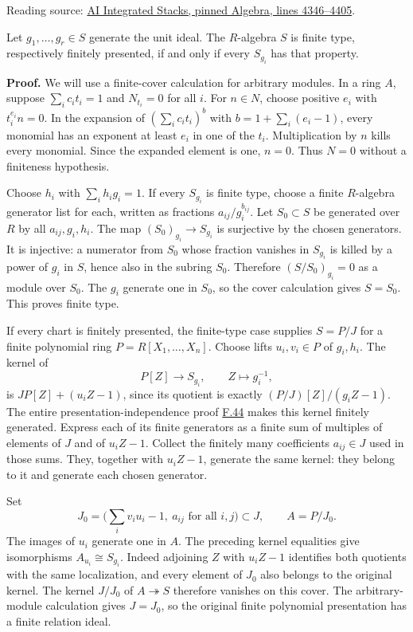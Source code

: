 \documentclass[11pt,a4paper,openany]{report}
\begin{document}
Reading source: \href{https://github.com/KokunoYumeto/unofficial-stacks-project-ai-drafts/blob/565b10e987aba5969b21145a0833f42d69f96790/algebra.tex\#L4346-L4405}{AI Integrated Stacks, pinned Algebra, lines 4346--4405}.

Let \(g_1,\ldots,g_r\in S\) generate the unit ideal. The \(R\)-algebra \(S\) is finite type, respectively finitely presented, if and only if every \(S_{g_i}\) has that property.

\textbf{Proof.} We will use a finite-cover calculation for arbitrary modules. In a ring \(A\), suppose \(\sum_i c_it_i=1\) and \(N_{t_i}=0\) for all \(i\). For \(n\in N\), choose positive \(e_i\) with \(t_i^{e_i}n=0\). In the expansion of \((\sum_i c_it_i)^b\) with \(b=1+\sum_i(e_i-1)\), every monomial has an exponent at least \(e_i\) in one of the \(t_i\). Multiplication by \(n\) kills every monomial. Since the expanded element is one, \(n=0\). Thus \(N=0\) without a finiteness hypothesis.

Choose \(h_i\) with \(\sum_i h_ig_i=1\). If every \(S_{g_i}\) is finite type, choose a finite \(R\)-algebra generator list for each, written as fractions \(a_{ij}/g_i^{b_{ij}}\). Let \(S_0\subset S\) be generated over \(R\) by all \(a_{ij},g_i,h_i\). The map \((S_0)_{g_i}\to S_{g_i}\) is surjective by the chosen generators. It is injective: a numerator from \(S_0\) whose fraction vanishes in \(S_{g_i}\) is killed by a power of \(g_i\) in \(S\), hence also in the subring \(S_0\). Therefore \((S/S_0)_{g_i}=0\) as a module over \(S_0\). The \(g_i\) generate one in \(S_0\), so the cover calculation gives \(S=S_0\). This proves finite type.

If every chart is finitely presented, the finite-type case supplies \(S=P/J\) for a finite polynomial ring \(P=R[X_1,\ldots,X_n]\). Choose lifts \(u_i,v_i\in P\) of \(g_i,h_i\). The kernel of \[P[Z]\longrightarrow S_{g_i},\qquad Z\longmapsto g_i^{-1},\] is \(JP[Z]+(u_iZ-1)\), since its quotient is exactly \((P/J)[Z]/(g_iZ-1)\). The entire presentation-independence proof \hyperref[AG-RG-S05-algebra-lemma-finite-presentation-independent]{F.44} makes this kernel finitely generated. Express each of its finite generators as a finite sum of multiples of elements of \(J\) and of \(u_iZ-1\). Collect the finitely many coefficients \(a_{ij}\in J\) used in those sums. They, together with \(u_iZ-1\), generate the same kernel: they belong to it and generate each chosen generator.

Set \[J_0=\bigl(\sum_i v_iu_i-1,\ a_{ij}\text{ for all }i,j\bigr)\subset J,\qquad A=P/J_0.\] The images of \(u_i\) generate one in \(A\). The preceding kernel equalities give isomorphisms \(A_{u_i}\cong S_{g_i}\). Indeed adjoining \(Z\) with \(u_iZ-1\) identifies both quotients with the same localization, and every element of \(J_0\) also belongs to the original kernel. The kernel \(J/J_0\) of \(A\twoheadrightarrow S\) therefore vanishes on this cover. The arbitrary-module calculation gives \(J=J_0\), so the original finite polynomial presentation has a finite relation ideal.
\end{document}
